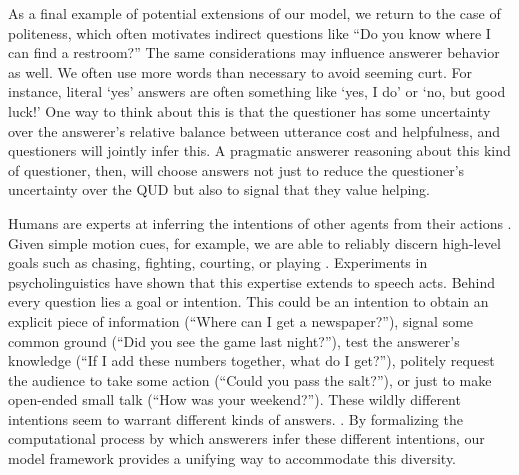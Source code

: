 \documentclass[12pt, floatsintext, jou]{apa6}
\begin{document}
As a final example of potential extensions of our model, we return to the case of politeness, which often motivates indirect questions like ``Do you know where I can find a restroom?'' The same considerations may influence answerer behavior as well. We often use more words than necessary to avoid seeming curt. For instance, literal `yes' answers are often something like `yes, I do' or `no, but good luck!' One way to think about this is that the questioner has some uncertainty over the answerer's relative balance between utterance cost and helpfulness, and questioners will jointly infer this. A pragmatic answerer reasoning about this kind of questioner, then, will choose answers not just to reduce the questioner's uncertainty over the QUD but also to signal that they value helping. 


Humans are experts at inferring the intentions of other agents from their actions \cite{TomaselloCarpenter___Moll05_IntentionsCulturalCognition, BakerSaxeTenenbaum09_ActionUnderstandingInversePlanning}. Given simple motion cues, for example, we are able to reliably discern high-level goals such as chasing, fighting, courting, or playing \cite{BarrettToddMillerBlythe05_IntentionFromMotionCues, HeiderSimmel44_Animacy}. Experiments in psycholinguistics have shown that this expertise extends to speech acts.  Behind every question lies a goal or intention. This could be an intention to obtain an explicit piece of information (``Where can I get a newspaper?''), signal some common ground (``Did you see the game last night?''), test the answerer's knowledge (``If I add these numbers together, what do I get?''), politely request the audience to take some action (``Could you pass the salt?''), or just to make open-ended small talk (``How was your weekend?''). These wildly different intentions seem to warrant different kinds of answers.%
. 
By formalizing the computational process by which answerers infer these different intentions, our model framework provides a unifying way to accommodate this diversity.  %
\end{document}

